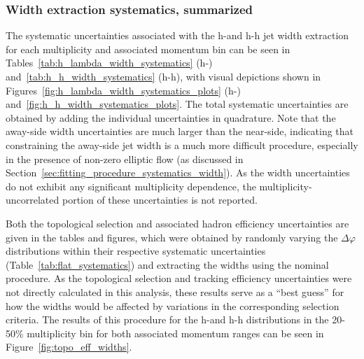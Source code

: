 \subsubsection{Width extraction systematics, summarized}
\label{sec:width_systematics_summary}

The systematic uncertainties associated with the h-\lmb and h-h jet width extraction for each multiplicity and associated momentum bin can be seen in Tables~\ref{tab:h_lambda_width_systematics} (h-\lmb) and~\ref{tab:h_h_width_systematics} (h-h), with visual depictions shown in Figures~\ref{fig:h_lambda_width_systematics_plots} (h-\lmb) and~\ref{fig:h_h_width_systematics_plots}. The total systematic uncertainties are obtained by adding the individual uncertainties in quadrature. Note that the away-side width uncertainties are much larger than the near-side, indicating that constraining the away-side jet width is a much more difficult procedure, especially in the presence of non-zero elliptic flow (as discussed in Section~\ref{sec:fitting_procedure_systematics_width}). As the width uncertainties do not exhibit any significant multiplicity dependence, the multiplicity-uncorrelated portion of these uncertainties is not reported.

Both the topological selection and associated hadron efficiency uncertainties are given in the tables and figures, which were obtained by randomly varying the $\Delta\varphi$ distributions within their respective systematic uncertainties (Table~\ref{tab:flat_systematics}) and extracting the widths using the nominal procedure. As the topological selection and tracking efficiency uncertainties were not directly calculated in this analysis, these results serve as a ``best guess'' for how the widths would be affected by variations in the corresponding selection criteria. The results of this procedure for the h-\lmb and h-h distributions in the 20-50\% multiplicity bin for both associated momentum ranges can be seen in Figure~\ref{fig:topo_eff_widths}. 



